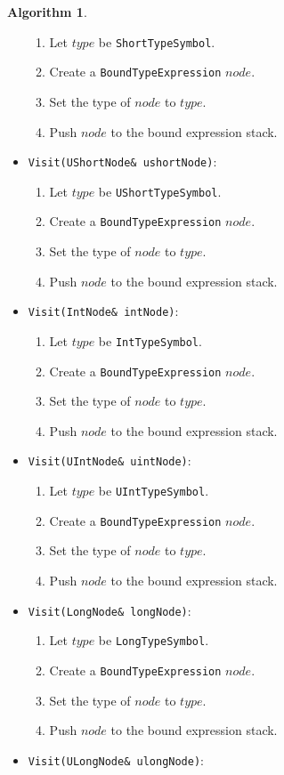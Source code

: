 \documentclass[a4paper,oneside,11pt]{book}
\theoremstyle{definition}
\newtheorem{algo}{Algorithm}[section]
\begin{document}
\begin{algo}
\begin{itemize}
\begin{enumerate}
\item
Let $type$ be \verb|ShortTypeSymbol|.
\item
Create a \verb|BoundTypeExpression| $node$.
\item
Set the type of $node$ to $type$.
\item
Push $node$ to the bound expression stack.
\end{enumerate}
\item
\verb|Visit(UShortNode& ushortNode)|:
\begin{enumerate}
\item
Let $type$ be \verb|UShortTypeSymbol|.
\item
Create a \verb|BoundTypeExpression| $node$.
\item
Set the type of $node$ to $type$.
\item
Push $node$ to the bound expression stack.
\end{enumerate}
\item
\verb|Visit(IntNode& intNode)|:
\begin{enumerate}
\item
Let $type$ be \verb|IntTypeSymbol|.
\item
Create a \verb|BoundTypeExpression| $node$.
\item
Set the type of $node$ to $type$.
\item
Push $node$ to the bound expression stack.
\end{enumerate}
\item
\verb|Visit(UIntNode& uintNode)|:
\begin{enumerate}
\item
Let $type$ be \verb|UIntTypeSymbol|.
\item
Create a \verb|BoundTypeExpression| $node$.
\item
Set the type of $node$ to $type$.
\item
Push $node$ to the bound expression stack.
\end{enumerate}
\item
\verb|Visit(LongNode& longNode)|:
\begin{enumerate}
\item
Let $type$ be \verb|LongTypeSymbol|.
\item
Create a \verb|BoundTypeExpression| $node$.
\item
Set the type of $node$ to $type$.
\item
Push $node$ to the bound expression stack.
\end{enumerate}
\item
\verb|Visit(ULongNode& ulongNode)|:

\end{itemize}
\end{algo}
\end{document}
